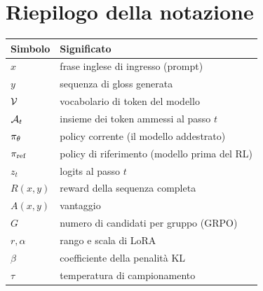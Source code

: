 \section{Riepilogo della notazione}

\begin{center}
\begin{tabular}{ll}
\toprule
Simbolo & Significato \\
\midrule
$x$ & frase inglese di ingresso (prompt) \\
$y$ & sequenza di gloss generata \\
$\mathcal{V}$ & vocabolario di token del modello \\
$\mathcal{A}_t$ & insieme dei token ammessi al passo $t$ \\
$\pi_\theta$ & policy corrente (il modello addestrato) \\
$\pi_{\text{ref}}$ & policy di riferimento (modello prima del RL) \\
$z_t$ & logits al passo $t$ \\
$R(x,y)$ & reward della sequenza completa \\
$A(x,y)$ & vantaggio \\
$G$ & numero di candidati per gruppo (GRPO) \\
$r, \alpha$ & rango e scala di LoRA \\
$\beta$ & coefficiente della penalità KL \\
$\tau$ & temperatura di campionamento \\
\bottomrule
\end{tabular}
\end{center}
